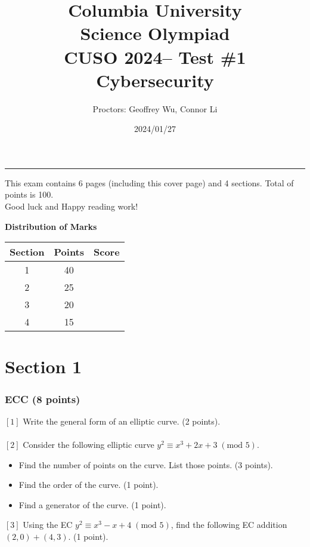 \documentclass[letterpaper,12pt,addpoints]{exam}
\newcommand{\university}{Columbia University}
\newcommand{\faculty}{Science Olympiad}
\newcommand{\class}{CUSO 2024}
\newcommand{\examnum}{Test \#1}
\newcommand{\content}{Cybersecurity}
\newcommand{\examdate}{2024/01/27}
\begin{document}
\title{\Large \textbf{\university\\ \faculty\\
\bigskip
\class -- \examnum \\ \content}}
\author{Proctors: Geoffrey Wu, Connor Li}
\date{\examdate}
\maketitle
\begin{flushleft}
\medskip
{}
\end{flushleft}
\noindent \rule{\textwidth}{1pt}

\noindent This exam contains 6 pages (including this cover page) and 4 sections. Total of points is 100.\\
Good luck and Happy reading work!

\begin{center}
\textbf{Distribution of Marks}\\
\end{center}
\begin{center}
\begin{tabular} {| c | c | c |}
    \hline
    Section & Points & Score \\
    \hline
    1 & 40 & \\
    \hline
    2 & 25 & \\
    \hline
    3 & 20 & \\
    \hline
    4 & 15 & \\
    \hline
\end{tabular}
\end{center}
\clearpage

\section*{Section 1}
\subsubsection*{ECC (8 points)}
$[1]$ Write the general form of an elliptic curve. (2 points).\\
\\
$[2]$ Consider the following elliptic curve $y^2 \equiv x^3 + 2x + 3\;(\text{mod } 5)$. 
\begin{itemize}
    \item Find the number of points on the curve. List those points. (3 points).
    \item Find the order of the curve. (1 point).
    \item Find a generator of the curve. (1 point).
\end{itemize}
$[3]$ Using the EC $y^2 \equiv x^3 - x + 4 \;(\text{mod } 5)$, find the following EC addition $(2,0) + (4,3)$. (1 point).
\end{document}
